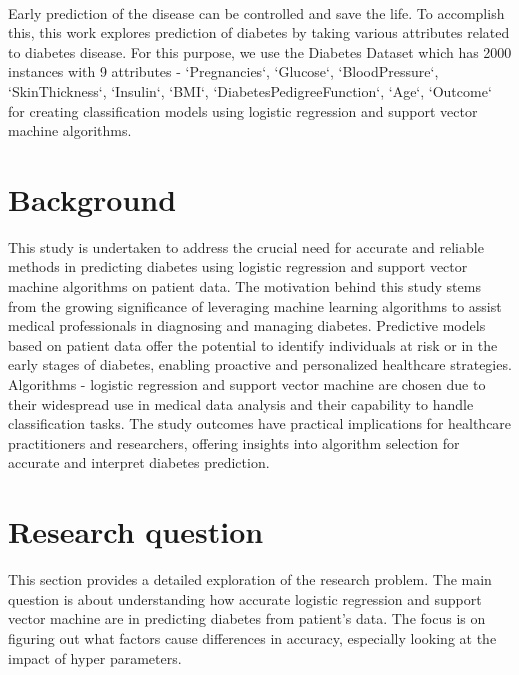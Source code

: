 ~\\[0cm]
Early prediction of the disease can be controlled and save the life. To accomplish this, this work explores prediction of diabetes by taking various attributes related to diabetes disease. For this purpose, we use the Diabetes Dataset \cite{dataset} which has 2000 instances with 9 attributes - `Pregnancies`, `Glucose`, `BloodPressure`, `SkinThickness`, `Insulin`, `BMI`, `DiabetesPedigreeFunction`, `Age`, `Outcome` for creating classification models using logistic regression and support vector machine algorithms.



\section{Background}
\label{sec:into_back}
This study is undertaken to address the crucial need for accurate and reliable methods in predicting diabetes using logistic regression and support vector machine algorithms on patient data. The motivation behind this study stems from the growing significance of leveraging machine learning algorithms to assist medical professionals in diagnosing and managing diabetes. Predictive models based on patient data offer the potential to identify individuals at risk or in the early stages of diabetes, enabling proactive and personalized healthcare strategies. Algorithms - logistic regression and support vector machine are chosen due to their widespread use in medical data analysis and their capability to handle classification tasks. The study outcomes have practical implications for healthcare practitioners and researchers, offering insights into algorithm selection for accurate and interpret diabetes prediction.

\section{Research question}
\label{sec:intro_prob_art, linewidth:80}
This section provides a detailed exploration of the research problem. The main question is about understanding how accurate logistic regression and support vector machine are in predicting diabetes from patient's data. The focus is on figuring out what factors cause differences in accuracy, especially looking at the impact of hyper parameters.

